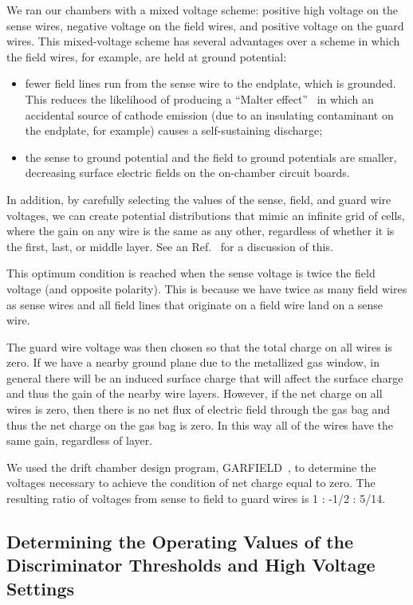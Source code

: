 We ran our chambers with a mixed voltage scheme:
positive high voltage on the sense wires, negative voltage on the
field wires, and positive voltage on the guard wires.
This mixed-voltage scheme has several advantages over a scheme in
which the field wires, for example, are held at ground potential:
\begin{itemize}
\item fewer field lines run from the sense wire to the endplate, which
is grounded.  This reduces the likelihood of producing a ``Malter effect''~\cite{malter} in
which an accidental source of cathode emission
(due to an insulating contaminant on the endplate, for example) causes
a self-sustaining discharge;
\item the sense to ground potential and the field to ground potentials 
are smaller, decreasing surface electric fields on the on-chamber
circuit boards.
\end{itemize}

In addition, by carefully selecting the values of the sense, field, and
guard wire voltages, we can create potential distributions that mimic
an infinite grid of cells, where the gain on any wire is the same as
any other, regardless of whether it is the first, last, or middle layer.
See an Ref.~\cite{mdm92} for a discussion of this.

This optimum condition is reached when the sense voltage is twice the
field voltage (and opposite polarity).  This is because we have twice as many
field wires as sense wires and all field lines that originate on a
field wire land on a sense wire.  

The guard wire voltage was then chosen so that the total charge on all wires is zero.  
If we have a nearby ground plane due to the metallized gas window, in general
there will be an induced surface charge that will affect the surface charge and
thus the gain of the nearby wire layers.  However, if the net charge on
all wires is zero, then there is no net flux of electric field through the
gas bag and thus the net charge on the gas bag is zero.  In this way all
of the wires have the same gain, regardless of layer.  

We used the drift chamber design program, GARFIELD~\cite{GARFIELD}, to determine the voltages
necessary to achieve the condition of net charge equal to zero.
The resulting ratio of voltages from sense to field to guard wires is 1 : -1/2 : 5/14.

\subsection{Determining the Operating Values of the Discriminator Thresholds and High Voltage Settings}
\label{determine-operating-parameters}

